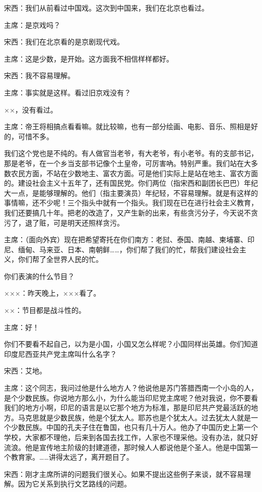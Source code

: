 宋西：我们从前看过中国戏。这次到中国来，我们在北京也看过。

主席：是京戏吗？

宋西：我们在北京看的是京剧现代戏。

主席：这是少数，是开始。这方面我不相信样样都好。

宋西：我不容易理解。

主席：事实就是这样。看过旧京戏没有？

××，没有看过。

主席：帝王将相搞点看看嘛。就比较嘛，也有一部分绘画、电影、音乐、照相是好的，可惜不多。

我们这个党也是不纯的。有人做官当老爷，有大老爷，有小老爷。有的支部书记，那是老爷，在一个乡当支部书记像个土皇帝，可厉害吶。特别严重。我们站在大多数农民方面，不站在少数地主、富农方面。可是他们实际上是站在地主、富农方面的。建设社会主义十五年了，还有国民党。你们两位（指宋西和副团长巴巴）年纪大一点，是能够理解的。他们（指主要演员）年纪轻，不容易理解。就是有这样的事情嘛，还不少呢！三个指头中就有一个指头。我们现在已在进行社会主义教育，我们还要搞几十年。把老的改造了，又产生新的出来，有些贪污分子，今天说不贪污了，退了赃，可是明天还照样贪污。

主席：（面向外宾）现在把希望寄托在你们南方：老挝、泰国、南越、柬埔寨、印尼、缅甸、马来亚、日本、南朝鲜……，你们帮了我们的忙，帮我们建设社会主义，你们帮了全世界人民的忙。

你们表演的什么节目？

×××：昨天晚上，×××看了。

××：节目都是战斗性的。

主席：好！


你们不要看不起自己，以为是小国，小国又怎么样呢？小国同样出英雄。你们知道印度尼西亚共产党主席叫什么名字？

宋西：艾地。

主席：这个同志，我问过他是什么地方人？他说他是苏门答腊西南一个小岛的人，是个少数民族。你说地方那么小，为什么能当印尼党主席呢？他对我说，你不要看我们的地方小啊，印尼的语言是以它那个地方为标准，那是印尼共产党最活跃的地方。马克思就是少数民族，他是个犹太人。耶苏也是个犹太人。过去犹太人就是一个少数民族。中国的孔夫子住在鲁国，也只有几十万人。他办了中国历史上第一个学校，大家都不理他，后来到各国去找工作，人家也不理采他。没有办法，就只好流浪。他是宣传地主阶级的封建道德，那时候人人都说他是个圣人。他是中国第一个教育家。……讲得太远了，离开题目了。

宋西：刚才主席所讲的问题我们很关心。如果不提出这些例子来谈，就不容易理解。因为它关系到执行文艺路线的问题。

